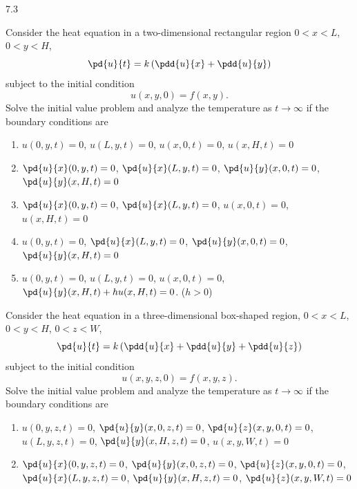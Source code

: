 \begin{exercises}{7.3}

\item Consider the heat equation in a two-dimensional rectangular region $0 < x < L$, $0 < y < H$,
\[
\pd{u}{t} = k\left(\pdd{u}{x} + \pdd{u}{y}\right)
\]
subject to the initial condition
\[
u(x,y,0) = f(x,y).
\]
Solve the initial value problem and analyze the temperature as $t \to \infty$ if the boundary conditions are

\begin{enumerate}
\item[\starred(a)] $u(0,y,t) = 0$, \quad $u(L,y,t) = 0$, \quad $u(x,0,t) = 0$, \quad $u(x,H,t) = 0$

\item[(b)] $\pd{u}{x}(0,y,t) = 0$, \quad $\pd{u}{x}(L,y,t) = 0$, \quad $\pd{u}{y}(x,0,t) = 0$, \quad $\pd{u}{y}(x,H,t) = 0$

\item[\starred(c)] $\pd{u}{x}(0,y,t) = 0$, \quad $\pd{u}{x}(L,y,t) = 0$, \quad $u(x,0,t) = 0$, \quad $u(x,H,t) = 0$

\item[(d)] $u(0,y,t) = 0$, \quad $\pd{u}{x}(L,y,t) = 0$, \quad $\pd{u}{y}(x,0,t) = 0$, \quad $\pd{u}{y}(x,H,t) = 0$

\item[(e)] $u(0,y,t) = 0$, \quad $u(L,y,t) = 0$, \quad $u(x,0,t) = 0$, \\
$\pd{u}{y}(x,H,t) + hu(x,H,t) = 0$. \quad ($h > 0$)
\end{enumerate}

\item Consider the heat equation in a three-dimensional box-shaped region, $0 < x < L$, $0 < y < H$, $0 < z < W$,
\[
\pd{u}{t} = k\left(\pdd{u}{x} + \pdd{u}{y} + \pdd{u}{z}\right)
\]
subject to the initial condition
\[
u(x,y,z,0) = f(x,y,z).
\]
Solve the initial value problem and analyze the temperature as $t \to \infty$ if the boundary conditions are

\begin{enumerate}
\item[(a)] $u(0,y,z,t) = 0$, \quad $\pd{u}{y}(x,0,z,t) = 0$, \quad $\pd{u}{z}(x,y,0,t) = 0$, \\
$u(L,y,z,t) = 0$, \quad $\pd{u}{y}(x,H,z,t) = 0$, \quad $u(x,y,W,t) = 0$

\item[\starred(b)] $\pd{u}{x}(0,y,z,t) = 0$, \quad $\pd{u}{y}(x,0,z,t) = 0$, \quad $\pd{u}{z}(x,y,0,t) = 0$, \\
$\pd{u}{x}(L,y,z,t) = 0$, \quad $\pd{u}{y}(x,H,z,t) = 0$, \quad $\pd{u}{z}(x,y,W,t) = 0$
\end{enumerate}


\end{exercises}
